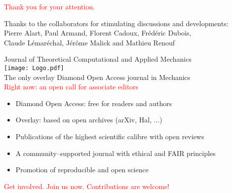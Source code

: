 \documentclass[8pt,red]{beamer}
\begin{document}
\frame
{

  

  \vspace{1cm}
  \centerline{\textcolor{red}{ Thank you for your attention.}}

  \begin{center}
    Thanks to the collaborators for stimulating discussions and developments:\\[2mm]
    
    Pierre Alart, Paul Armand, Florent Cadoux, Fr\'ed\'eric Dubois,\\
    Claude L\'emar\'echal, J\'er\^ome Malick and Mathieu Renouf 
  \end{center}
}
\begin{frame}
\begin{center}
    \large{Journal of Theoretical Computational and Applied Mechanics}\\[2mm]
    
    \texttt{[image: Logo.pdf]}\\[3mm]

    {The only overlay Diamond Open Access journal in Mechanics}\\[1mm]

    \large\textcolor{red}{Right now: an open call for associate editors}


\end{center}
\vspace{1mm}
\begin{itemize}
    \item Diamond Open Access: free for readers and authors
    \item Overlay: based on open archives (arXiv, Hal, ...)
    \item Publications of the highest scientific calibre with open reviews
    \item A community--supported journal with ethical and  FAIR principles
    \item Promotion of reproducible and open science
\end{itemize}
\vspace{1mm}
\begin{center}

  \large\textcolor{red}{Get involved. Join us now. Contributions are welcome!}\\
  
  

\end{center}
\end{frame}


 
\def\newblock{}
{\scriptsize
\printbibliography
}
\end{document}
